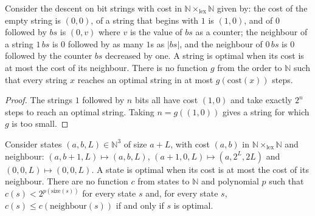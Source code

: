 \begin{theorem}
  \label{thm:search-recarga-sin-cota}
  \leanok
  Consider the descent on bit strings with cost in $\mathbb{N} \times_{\mathrm{lex}} \mathbb{N}$
  given by: the cost of the empty string is $(0, 0)$, of a string that begins with $1$ is
  $(1, 0)$, and of $0$ followed by $bs$ is $(0, v)$ where $v$ is the value of $bs$ as a counter;
  the neighbour of a string $1\,bs$ is $0$ followed by as many $1$s as $|bs|$, and the neighbour of
  $0\,bs$ is $0$ followed by the counter $bs$ decreased by one. A string is optimal when its cost is
  at most the cost of its neighbour. There is no function $g$ from the order to $\mathbb{N}$ such
  that every string $x$ reaches an optimal string in at most $g(\mathrm{cost}(x))$ steps.
\end{theorem}

\begin{proof}
  \leanok
  The strings $1$ followed by $n$ bits all have cost $(1, 0)$ and take exactly $2^n$ steps to reach
  an optimal string. Taking $n = g((1, 0))$ gives a string for which $g$ is too small.
\end{proof}

\begin{theorem}
  \label{thm:search-creciente-no-colapsa}
  \leanok
  Consider states $(a, b, L) \in \mathbb{N}^3$ of size $a + L$, with cost $(a, b)$ in
  $\mathbb{N} \times_{\mathrm{lex}} \mathbb{N}$ and neighbour: $(a, b+1, L) \mapsto (a, b, L)$,
  $(a+1, 0, L) \mapsto (a, 2^L, 2L)$ and $(0, 0, L) \mapsto (0, 0, L)$. A state is optimal when its
  cost is at most the cost of its neighbour. There are no function $c$ from states to
  $\mathbb{N}$ and polynomial $p$ such that $c(s) < 2^{p(\text{size}(s))}$ for every state $s$ and,
  for every state $s$, $c(s) \le c(\text{neighbour}(s))$ if and only if $s$ is optimal.
\end{theorem}

